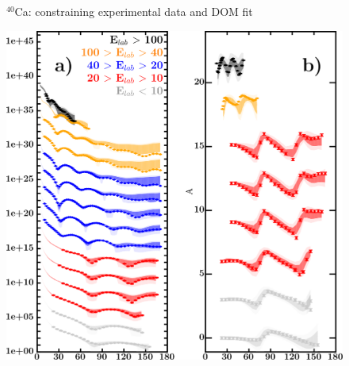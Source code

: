 \documentclass[twocolumn,secnumarabic,amssymb, nobibnotes, aps, prl,
superscriptaddress, nobalancelastpage, draft]{revtex4}
\newcommand{\caForty}{\ensuremath{^{40}}C\lowercase{a}}
\begin{document}
\begin{figure}[!htb]
\begin{minipage}{0.4\linewidth}
        \label{DOM_ca40_BE}
    \end{minipage}
    \caption{\caForty: constraining experimental data and DOM fit}
    \label{DOM_ca40_structural}
\end{figure}

\begin{figure}[!htb]
    \centering
    \begin{minipage}{0.4\linewidth}
        \centering
        \includegraphics[width=\linewidth]{figures/ca48_protonElastic.png}
        \label{DOM_ca48_proton_elastic}
    \end{minipage}\hspace{6pt}
    \begin{minipage}{0.4\linewidth}
        \centering
        \vspace{-10pt}
        \begin{minipage}[c]{0.5\linewidth}
            \centering

\end{minipage}
\end{minipage}
\end{figure}
\end{document}
